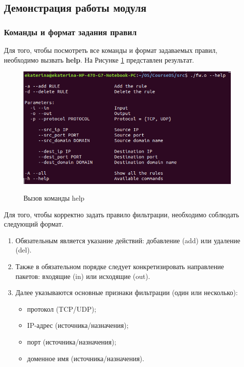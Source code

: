 \subsection{Демонстрация работы модуля} 

\subsubsection{Команды и формат задания правил}
Для того, чтобы посмотреть все команды и формат задаваемых правил, необходимо вызвать \textbf{help}. На Рисунке \ref{fig11:image} представлен результат.

\begin{figure}[h]
	\begin{center}
		{\includegraphics[scale = 0.6]{img/screenshots/help/help.png}}
		\caption{Вызов команды help}
		\label{fig11:image}
	\end{center}
\end{figure}
Для того, чтобы корректно задать правило фильтрации, необходимо соблюдать следующий формат.
\begin{enumerate}
	\item Обязательным является указание действий: добавление (add) или удаление (del).
	
	\item Также в обязательном порядке следует конкретизировать направление пакетов: входящие (in) или исходящие (out).

	\item Далее указываются основные признаки фильтрации (один или несколько):
	\begin{itemize}
		\item протокол (TCP/UDP);
		
		\item IP-адрес (источника/назначения);
		
		\item порт (источника/назначения);
		
		\item доменное имя (источника/назначения). \newline
	\end{itemize}
	
\end{enumerate}

